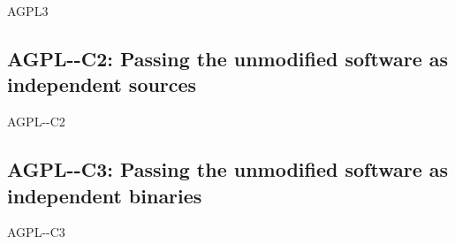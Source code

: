 \begin{license}{AGPL3}
\subsection{AGPL-\ver-C2: Passing the unmodified software as independent sources}
\begin{lsuc}{AGPL-\ver-C2}
  \label{OSUC-02S-AGPL}
  \label{OSUC-05S-AGPL}

  \useCaseTwo

  \begin{lsucrequires}
    \lsucmandatory{\keepLicenseElements}
    \lsucmandatory{\gplthreeEnsureCopyrightNoticeSource}
    \lsucmandatory{\giveLicense}\passingFilesCorrectly
    \lsucmandatory{\retainCopyrightNotices}
    \lsucoptional{\addToDocumentation}
  \end{lsucrequires}

  \begin{lsucprohibits}
    \lsucitem{\noPatentLitigation}
  \end{lsucprohibits}
\end{lsuc}

\subsection{AGPL-\ver-C3: Passing the unmodified software as independent binaries} 
\begin{lsuc}{AGPL-\ver-C3}
  \label{OSUC-02B-AGPL}
  \label{OSUC-05B-AGPL}


  \useCaseThree

  \begin{lsucrequires}
    \lsucmandatory{\keepLicenseElements}
    \lsucmandatory{\gplthreeEnsureCopyrightNoticeBinary}
    \lsucmandatory{\giveLicense}\passingFilesCorrectly  
    \lsucmandatory{\makeUnmodifiedSourceAvailable}
    \lsucmandatory{\describeHowToGetSource}
    \lsucmandatory{\retainCopyrightNotices}
    \lsucoptional{\addToDocumentation}
  \end{lsucrequires}

  \begin{lsucprohibits}
    \lsucitem{\noPatentLitigation}
  \end{lsucprohibits}
\end{lsuc}


\end{license}
